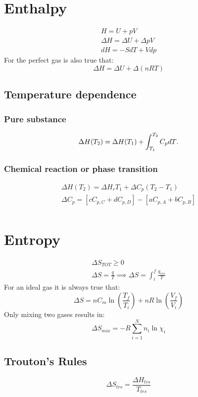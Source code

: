 \documentclass[Master.tex]{subfiles}
\begin{document}
\begin{multicols}{2}
		 \section{Enthalpy}
		  \begin{gather*}
				   H = U + pV\\
				   \Delta H = \Delta U + \Delta pV \\
				   dH = -SdT + Vdp
		  \end{gather*}
		  For the perfect gas is also true that:
		  \[
				   \Delta H = \Delta U + \Delta (nRT)
		  \]

		  \subsection{Temperature dependence}
				   \subsubsection{Pure substance}
						    \[
								     \Delta H(T_2) = \Delta H(T_1) + \int _{T_1} ^{T_2} C_{p}dT\\
								     .\]
				   \subsubsection{Chemical reaction or phase transition}
						    \begin{gather*}
								     \Delta H(T_2) = \Delta H_{r}T_1 + \Delta C_{p}(T_2 - T_1)\\
								     \Delta C_{p} = [c C_{p,C} + d C_{p,D}] - [a C_{p,A} + b C_{p,B}] \\
						    \end{gather*}

		 \section{Entropy}

		  \begin{gather*}
				   \Delta S_{TOT} \geq 0 \\
				   \Delta S  = \frac{q}{T} \implies \Delta S = \int _{i} ^{f} \frac{q_{rev}}{T}
		  \end{gather*}
		  For an ideal gas it is always true that:
		  \[
				   \Delta S = nC_{m}\ln \left( \frac{T_{f}}{T_{i} }  \right) + nR\ln \left( \frac{V_{f}}{V_{i} }  \right)
		  \]
		  Only mixing two gases results in:
		  \[
				   \Delta S_{mix} = -R \sum_{i=1}^{N} n_{i}\ln \chi _{i}
		  \]
		  \subsection{Trouton's Rules }
				   \[
						    \Delta S_{trs} = \frac{\Delta H _{trs} }{T_{trs} }
				   \]


\end{multicols}
\end{document}
